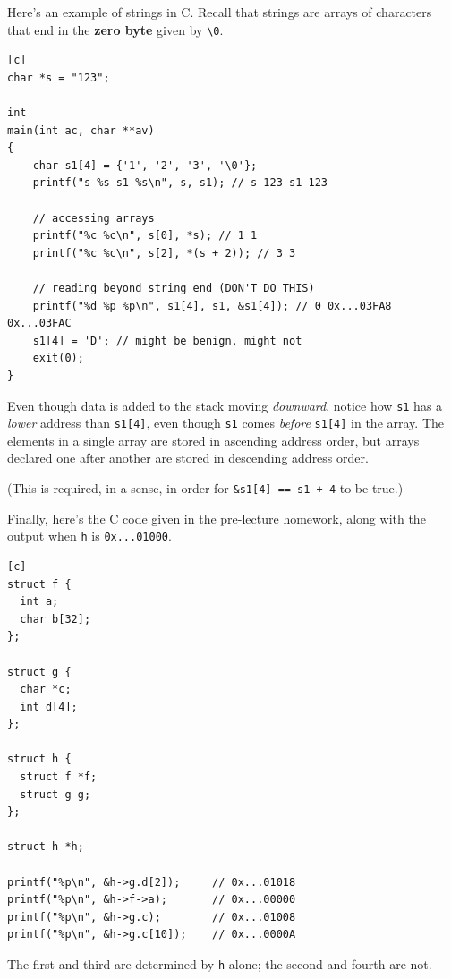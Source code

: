 Here's an example of strings in C.
Recall that strings are arrays of characters that end in
the \textbf{zero byte} given by \verb|\0|.

\begin{verbatim}[c]
char *s = "123";

int
main(int ac, char **av)
{
    char s1[4] = {'1', '2', '3', '\0'};
    printf("s %s s1 %s\n", s, s1); // s 123 s1 123

    // accessing arrays
    printf("%c %c\n", s[0], *s); // 1 1
    printf("%c %c\n", s[2], *(s + 2)); // 3 3

    // reading beyond string end (DON'T DO THIS)
    printf("%d %p %p\n", s1[4], s1, &s1[4]); // 0 0x...03FA8 0x...03FAC
    s1[4] = 'D'; // might be benign, might not
    exit(0);
}
\end{verbatim}

Even though data is added to the stack moving \emph{downward},
notice how \verb|s1| has a \emph{lower} address than \verb|s1[4]|,
even though \verb|s1| comes \emph{before} \verb|s1[4]| in the array.
The elements in a single array are stored in ascending address order,
but arrays declared one after another are stored in descending address order.

(This is required, in a sense, in order for \verb|&s1[4] == s1 + 4| to be true.)

Finally, here's the C code given in the pre-lecture homework,
along with the output when \verb|h| is \verb|0x...01000|.

\begin{verbatim}[c]
struct f {
  int a;
  char b[32];
};

struct g {
  char *c;
  int d[4];
};

struct h {
  struct f *f;
  struct g g;
};

struct h *h;

printf("%p\n", &h->g.d[2]);     // 0x...01018
printf("%p\n", &h->f->a);       // 0x...00000
printf("%p\n", &h->g.c);        // 0x...01008
printf("%p\n", &h->g.c[10]);    // 0x...0000A
\end{verbatim}
The first and third are determined by \verb|h| alone;
the second and fourth are not.


